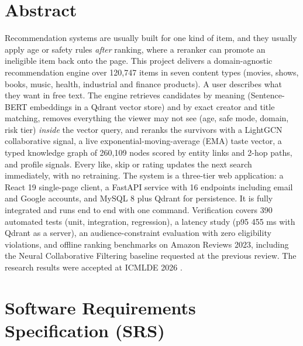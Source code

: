 \documentclass[11pt, a4paper]{article}
\begin{document}
\section{Abstract}
\noindent
Recommendation systems are usually built for one kind of item, and they usually apply age or safety rules \emph{after} ranking, where a reranker can promote an ineligible item back onto the page. This project delivers a domain-agnostic recommendation engine over 120,747 items in seven content types (movies, shows, books, music, health, industrial and finance products). A user describes what they want in free text. The engine retrieves candidates by meaning (Sentence-BERT embeddings in a Qdrant vector store) and by exact creator and title matching, removes everything the viewer may not see (age, safe mode, domain, risk tier) \emph{inside} the vector query, and reranks the survivors with a LightGCN collaborative signal, a live exponential-moving-average (EMA) taste vector, a typed knowledge graph of 260,109 nodes scored by entity links and 2-hop paths, and profile signals. Every like, skip or rating updates the next search immediately, with no retraining. The system is a three-tier web application: a React 19 single-page client, a FastAPI service with 16 endpoints including email and Google accounts, and MySQL 8 plus Qdrant for persistence. It is fully integrated and runs end to end with one command. Verification covers 390 automated tests (unit, integration, regression), a latency study (p95 455 ms with Qdrant as a server), an audience-constraint evaluation with zero eligibility violations, and offline ranking benchmarks on Amazon Reviews 2023, including the Neural Collaborative Filtering baseline requested at the previous review. The research results were accepted at ICMLDE 2026 \cite{ak2026crossmedia}.

\section{Software Requirements Specification (SRS)}
\end{document}

